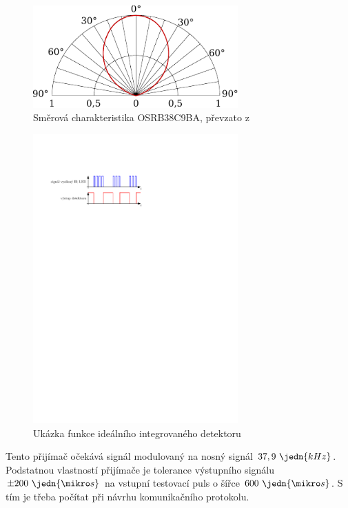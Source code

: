 \begin{figure}[H]
    \begin{center}
        \includegraphics[width=0.7\textwidth]{img/OSRB38C9BA-direction}
    \end{center}
    \caption{Směrová charakteristika OSRB38C9BA, převzato z \cite{OSRB38C9BA}}
\end{figure}

\begin{figure}[H]
    \begin{center}
        \includegraphics[width=0.7\textwidth]{img/funkce-ir-detektoru}
    \end{center}
    \caption{Ukázka funkce ideálního integrovaného detektoru}
\end{figure}

Tento přijímač očekává signál modulovaný na nosný signál $37,9~\jedn{kHz}$. Podstatnou vlastností přijímače je tolerance výstupního signálu $\pm 200~\jedn{\mikro s}$ na vstupní testovací puls o šířce $600~\jedn{\mikro s}$. S tím je třeba počítat při návrhu komunikačního protokolu.

